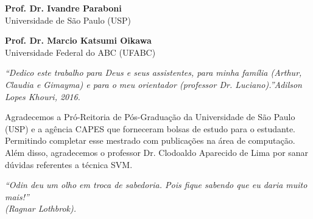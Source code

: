 \documentclass[
	12pt,				%
	oneside,			%
	a4paper,			%
	english,			%
	brazil				%
	]{abntex2ppgsi}
\def \varAutorData {Adilson Lopes Khouri, 2016}
\numberwithin{equation}{section}
\begin{document}
\begin{folhadeaprovacao}
\begin{center}
\vspace*{2cm}

\textbf{Prof. Dr. Ivandre Paraboni} 
\\ Universidade de São Paulo (USP)

\vspace*{2cm}

\textbf{Prof. Dr. Marcio Katsumi Oikawa} 
\\ Universidade Federal do ABC (UFABC)

\end{center}
  
\end{folhadeaprovacao}

%
% 
\begin{dedicatoria}
   \vspace*{\fill}
   \centering
   \noindent
   \textit{   
   ``Dedico este trabalho para Deus e seus assistentes, para minha família (Arthur, Claudia e Gimayma) e para o meu orientador (professor Dr. Luciano).''\varAutorData. } 
	 \vspace*{\fill}
\end{dedicatoria}

%
% 
%
\begin{agradecimentos}
Agradecemos a Pró-Reitoria de Pós-Graduação da Universidade de São Paulo (USP) e a agência CAPES que forneceram bolsas de estudo para o estudante. Permitindo completar esse mestrado com publicações na área de computação. Além disso, agradecemos o professor Dr. Clodoaldo Aparecido de Lima por sanar dúvidas referentes a técnica SVM.
\end{agradecimentos}

%
% 
\begin{epigrafe}
    \vspace*{\fill}
	\begin{flushright}
		\textit{``Odin deu um olho em troca de sabedoria. Pois fique sabendo que eu daria muito mais!''\\(Ragnar Lothbrok).}	
	\end{flushright}
\end{epigrafe}
\end{document}
